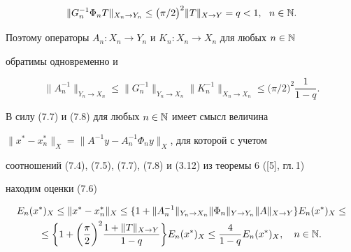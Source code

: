 $$


\|G_n^{-1}\Phi_nT\|_{X_n\to Y_n}\le \big(\pi/2\big)^2\|T\|_{X\to


Y}=q < 1,\ \ n \in \N.


$$


Поэтому операторы $A_n:X_n\to Y_n$ и $K_n:X_n\to X_n$ для любых $n \in \Bbb N$


обратимы одновременно и


\begin{equation}


\|A^{-1}_n\|_{Y_n\to X_n}\le \|G^{-1}_n\|_{Y_n\to X_n}\|K_n^{-1}\|_{X_n\to


X_n}\le \big(\pi/2\big)^2\frac{1}{1-q}.


\end{equation}





В силу (7.7) и (7.8) для любых $n\in \Bbb N$ имеет смысл величина


$\|x^*-x^*_n\|_X=\|A^{-1}y-A^{-1}_n\Phi_ny\|_X$, для которой с учетом


соотношений (7.4), (7.5), (7.7), (7.8) и (3.12) из теоремы 6 ([5], гл.\,1)


находим оценки (7.6)


\begin{multline*}


E_n(x^*)_X\le \|x^*-x^*_n\|_X\le \{1+\|A_n^{-1}\|_{Y_n\to X_n}


\|\Phi_n\|_{Y\to Y_n} \|A\|_{X\to Y}\}E_n(x^*)_X\le \\


%


\le \bigg\{1+\bigg(\frac{\pi}{2}\bigg)^2 \frac{1+\|T\|_{X\to Y}}{1-q}\bigg\}


E_n(x^*)_X\le \frac{4}{1-q}E_n(x^*)_X,\quad n\in \N.


\end{multline*}





